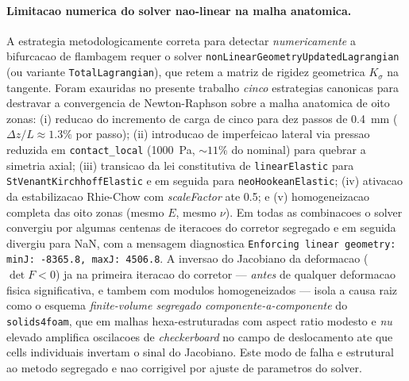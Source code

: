 \paragraph{Limitacao numerica do solver nao-linear na malha anatomica.} A estrategia metodologicamente correta para detectar \emph{numericamente} a bifurcacao de flambagem requer o solver \texttt{nonLinearGeometryUpdatedLagrangian} (ou variante \texttt{TotalLagrangian}), que retem a matriz de rigidez geometrica $K_{\sigma}$ na tangente. Foram exauridas no presente trabalho \emph{cinco} estrategias canonicas para destravar a convergencia de Newton-Raphson sobre a malha anatomica de oito zonas: (i) reducao do incremento de carga de cinco para dez passos de \SI{0.4}{\milli\meter} ($\Delta z / L \approx 1.3\%$ por passo); (ii) introducao de imperfeicao lateral via pressao reduzida em \texttt{contact\_local} (\SI{1000}{\pascal}, $\sim 11\%$ do nominal) para quebrar a simetria axial; (iii) transicao da lei constitutiva de \texttt{linearElastic} para \texttt{StVenantKirchhoffElastic} e em seguida para \texttt{neoHookeanElastic}; (iv) ativacao da estabilizacao Rhie-Chow com \emph{scaleFactor} ate 0.5; e (v) homogeneizacao completa das oito zonas (mesmo $E$, mesmo $\nu$). Em todas as combinacoes o solver convergiu por algumas centenas de iteracoes do corretor segregado e em seguida divergiu para NaN, com a mensagem diagnostica \texttt{Enforcing linear geometry: minJ: -8365.8, maxJ: 4506.8}. A inversao do Jacobiano da deformacao ($\det F < 0$) ja na primeira iteracao do corretor --- \emph{antes} de qualquer deformacao fisica significativa, e tambem com modulos homogeneizados --- isola a causa raiz como o esquema \emph{finite-volume segregado componente-a-componente} do \texttt{solids4foam}, que em malhas hexa-estruturadas com aspect ratio modesto e \emph{nu} elevado amplifica oscilacoes de \emph{checkerboard} no campo de deslocamento ate que cells individuais invertam o sinal do Jacobiano. Este modo de falha e estrutural ao metodo segregado e nao corrigivel por ajuste de parametros do solver.


